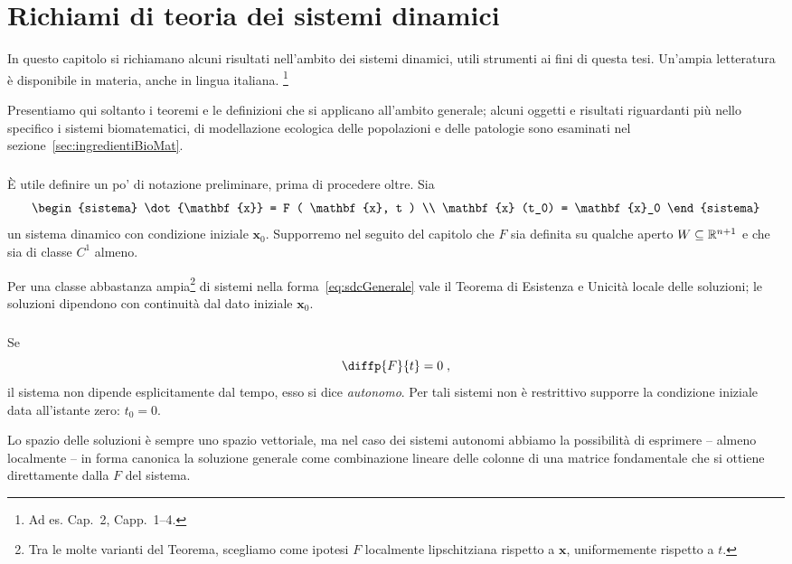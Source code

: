 \chapter{Richiami di teoria dei sistemi dinamici}
\label{chap:teoria}
In questo capitolo si richiamano alcuni risultati nell'ambito dei sistemi dinamici, utili strumenti ai fini
di questa tesi.
Un'ampia letteratura è disponibile in materia, anche in lingua italiana.
\footnote{Ad es. \cite{ricciSistDin} Cap.~2, \cite{introSD} Capp.~1--4.}

Presentiamo qui soltanto i teoremi e le definizioni che si applicano all'ambito generale; alcuni oggetti
e risultati riguardanti più nello specifico i sistemi biomatematici, di modellazione ecologica delle popolazioni
e delle patologie sono esaminati nel sezione~\ref{sec:ingredientiBioMat}.

\paragraph{}
È utile definire un po' di notazione preliminare, prima di procedere oltre.
Sia
\begin{equation}
\begin{sistema}
\dot{\mathbf{x}} = F ( \mathbf{x}, t ) \\
\mathbf{x} (t_0) = \mathbf{x}_0
\end{sistema}
\label{eq:sdcGenerale}
\end{equation}
un sistema dinamico con condizione iniziale $\mathbf{x}_0$. Supporremo nel seguito del capitolo che $F$ sia
definita su qualche aperto $W \subseteq \mathbb{R}^{n+1}$ e che sia di classe $C^1$ almeno.

Per una classe abbastanza ampia\footnote{Tra le molte varianti del Teorema, scegliamo come ipotesi $F$
localmente lipschitziana rispetto a $\mathbf{x}$, uniformemente rispetto a $t$.}
di sistemi nella forma~\eqref{eq:sdcGenerale} vale il Teorema di Esistenza e Unicità locale delle soluzioni;
le soluzioni dipendono con continuità dal dato iniziale $\mathbf{x}_0$.

\paragraph{}
Se
$$\diffp{F}{t} = 0 \; ,$$
\ie il sistema non dipende esplicitamente dal tempo, esso si dice \emph{autonomo}.
Per tali sistemi non è restrittivo supporre la condizione iniziale data all'istante zero: $t_0=0$.

Lo spazio delle soluzioni è sempre uno spazio vettoriale, ma nel caso dei sistemi autonomi abbiamo
la possibilità di esprimere -- almeno localmente -- in forma canonica la soluzione generale come
combinazione lineare delle colonne di una matrice fondamentale che si ottiene direttamente
dalla $F$ del sistema.

